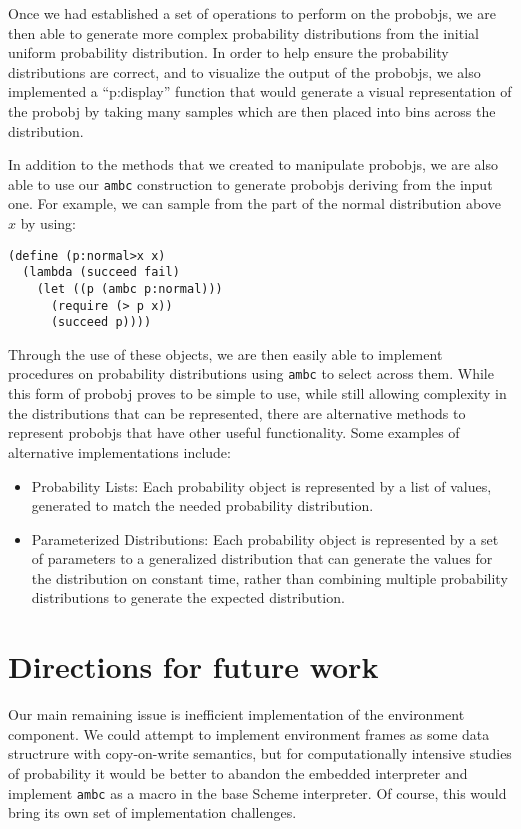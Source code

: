 \documentclass{article}
\begin{document}
Once we had established a set of operations to perform on the
{probobj}s, we are then able to generate more complex probability
distributions from the initial uniform probability distribution. In
order to help ensure the probability distributions are correct, and to
visualize the output of the {probobj}s, we also implemented a
``p:display'' function that would generate a visual representation of
the {probobj} by taking many samples which are then placed into bins
across the distribution.

In addition to the methods that we created to manipulate {probobj}s,
we are also able to use our \texttt{ambc} construction to generate
{probobj}s deriving from the input one. For example, we can sample
from the part of the normal distribution above $x$ by using:

\begin{lstlisting}
(define (p:normal>x x)
  (lambda (succeed fail)
    (let ((p (ambc p:normal)))
      (require (> p x))
      (succeed p))))
\end{lstlisting}

Through the use of these objects, we are then easily able to implement
procedures on probability distributions using \texttt{ambc} to select across
them. While this form of {probobj} proves to be simple to use, while still
allowing complexity in the distributions that can be represented, there are
alternative methods to represent {probobj}s that have other useful
functionality. Some examples of alternative implementations include:

\begin{itemize}
  \item Probability Lists: Each probability object is represented by a list of
    values, generated to match the needed probability distribution.
  \item Parameterized Distributions: Each probability object is represented by a
    set of parameters to a generalized distribution that can generate the values
    for the distribution on constant time, rather than combining multiple
    probability distributions to generate the expected distribution.
\end{itemize} 

\section{Directions for future work}

Our main remaining issue is inefficient implementation of the
environment component.  We could attempt to implement environment
frames as some data structrure with copy-on-write semantics, but for
computationally intensive studies of probability it would be better to
abandon the embedded interpreter and implement \texttt{ambc} as a
macro in the base Scheme interpreter.  Of course, this would bring its
own set of implementation challenges.
\end{document}
